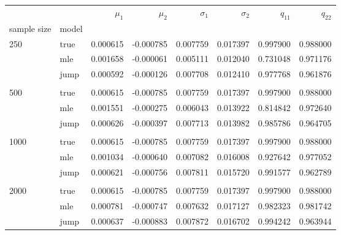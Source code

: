 \begin{tabular}{llrrrrrr}
\toprule
     &      &   $\mu_1$ &   $\mu_2$ &  $\sigma_1$ &  $\sigma_2$ &    $q_{11}$ &    $q_{22}$ \\
sample size & model &           &           &             &             &           &           \\
\midrule
250  & true &  0.000615 & -0.000785 &    0.007759 &    0.017397 &  0.997900 &  0.988000 \\
     & mle &  0.001658 & -0.000061 &    0.005111 &    0.012040 &  0.731048 &  0.971176 \\
     & jump &  0.000592 & -0.000126 &    0.007708 &    0.012410 &  0.977768 &  0.961876 \\
     \\
500  & true &  0.000615 & -0.000785 &    0.007759 &    0.017397 &  0.997900 &  0.988000 \\
     & mle &  0.001551 & -0.000275 &    0.006043 &    0.013922 &  0.814842 &  0.972640 \\
     & jump &  0.000626 & -0.000397 &    0.007713 &    0.013982 &  0.985786 &  0.964705 \\
    \\
1000 & true &  0.000615 & -0.000785 &    0.007759 &    0.017397 &  0.997900 &  0.988000 \\
     & mle &  0.001034 & -0.000640 &    0.007082 &    0.016008 &  0.927642 &  0.977052 \\
     & jump &  0.000621 & -0.000756 &    0.007811 &    0.015720 &  0.991577 &  0.962789 \\
     \\
2000 & true &  0.000615 & -0.000785 &    0.007759 &    0.017397 &  0.997900 &  0.988000 \\
     & mle &  0.000781 & -0.000747 &    0.007632 &    0.017127 &  0.982323 &  0.981742 \\
     & jump &  0.000637 & -0.000883 &    0.007872 &    0.016702 &  0.994242 &  0.963944 \\
\bottomrule
\end{tabular}
